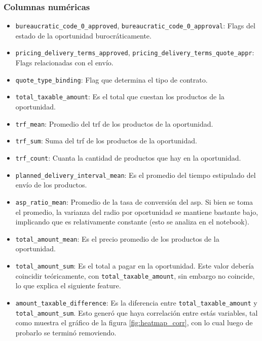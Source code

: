 \documentclass[titlepage,a4paper]{article}
\begin{document}
\subsubsection{Columnas numéricas}
\begin{itemize}
    \item \verb|bureaucratic_code_0_approved|, \verb|bureaucratic_code_0_approval|: Flags del estado de la oportunidad burocráticamente.
    \item \verb|pricing_delivery_terms_approved|, \verb|pricing_delivery_terms_quote_appr|: Flags relacionadas con el envío.
    \item \verb|quote_type_binding|: Flag que determina el tipo de contrato.
    \item \verb|total_taxable_amount|: Es el total que cuestan los productos de la oportunidad.
    \item \verb|trf_mean|: Promedio del trf de los productos de la oportunidad.
    \item \verb|trf_sum|: Suma del trf de los productos de la oportunidad.
    \item \verb|trf_count|: Cuanta la cantidad de productos que hay en la oportunidad.
    \item \verb|planned_delivery_interval_mean|: Es el promedio del tiempo estipulado del envío de los productos.
    \item \verb|asp_ratio_mean|: Promedio de la tasa de conversión del asp. Si bien se toma el promedio, la varianza del radio por oportunidad se mantiene bastante bajo, implicando que es relativamente constante (esto se analiza en el notebook).
    \item \verb|total_amount_mean|: Es el precio promedio de los productos de la oportunidad.
    \item \verb|total_amount_sum|: Es el total a pagar en la oportunidad. Este valor debería coincidir teóricamente, con \verb|total_taxable_amount|, sin embargo no coincide, lo que explica el siguiente feature.
    \item \verb|amount_taxable_difference|: Es la diferencia entre \verb|total_taxable_amount| y \verb|total_amount_sum|. Esto generó que haya correlación entre estás variables, tal como muestra el gráfico de la figura \ref{fig:heatmap_corr}, con lo cual luego de probarlo se terminó removiendo.
\end{itemize}
\end{document}
